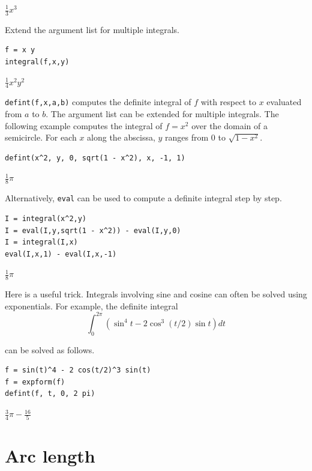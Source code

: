 \documentclass[12pt]{article}
\begin{document}
$\displaystyle \tfrac{1}{3}x^3$

\bigskip
Extend the argument list for multiple integrals.

{\color{blue}
\begin{verbatim}
f = x y
integral(f,x,y)
\end{verbatim}
}

$\displaystyle \tfrac{1}{4}x^2y^2$

\bigskip
\verb$defint(f,x,a,b)$
computes the definite integral of $f$ with respect to $x$ evaluated from
$a$ to $b$.
The argument list can be extended for multiple integrals.
The following example computes the integral of $f=x^2$
over the domain of a semicircle.
For each $x$ along the abscissa, $y$ ranges from 0 to $\sqrt{1-x^2}$.

{\color{blue}
\begin{verbatim}
defint(x^2, y, 0, sqrt(1 - x^2), x, -1, 1)
\end{verbatim}
}

$\displaystyle \tfrac{1}{8}\pi$

\bigskip
Alternatively, \verb$eval$ can be used to compute a definite integral step by step.

{\color{blue}
\begin{verbatim}
I = integral(x^2,y)
I = eval(I,y,sqrt(1 - x^2)) - eval(I,y,0)
I = integral(I,x)
eval(I,x,1) - eval(I,x,-1)
\end{verbatim}
}

$\displaystyle \tfrac{1}{8}\pi$

\bigskip
Here is a useful trick.
Integrals involving sine and cosine
can often be solved using exponentials.
For example, the definite integral
\begin{equation*}
\int_0^{2\pi}\left(\sin^4t-2\cos^3(t/2)\sin t\right)dt
\end{equation*}

can be solved as follows.

{\color{blue}
\begin{verbatim}
f = sin(t)^4 - 2 cos(t/2)^3 sin(t)
f = expform(f)
defint(f, t, 0, 2 pi)
\end{verbatim}
}

$\displaystyle \tfrac{3}{4}\pi-\tfrac{16}{5}$

\newpage

\section{Arc length}
\end{document}
